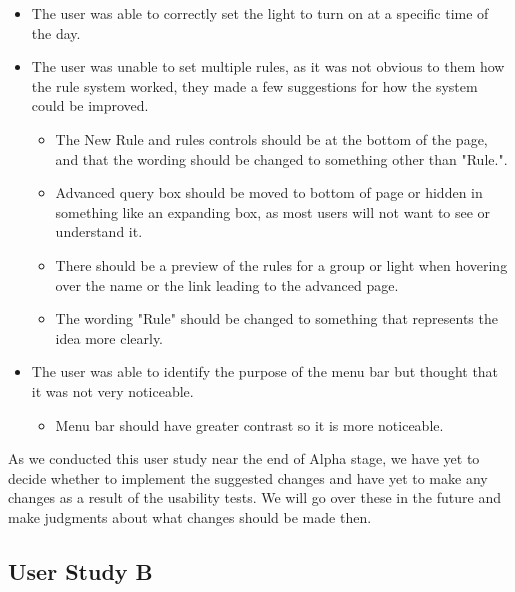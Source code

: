 \documentclass[10pt,draftclsnofoot,onecolumn]{IEEEtran}
\begin{document}
\begin{itemize}
    \item The user was able to correctly set the light to turn on at a specific
        time of the day.
    \item The user was unable to set multiple rules, as it was not obvious to
        them how the rule system worked, they made a few suggestions for how
        the system could be improved.
        \begin{itemize}
            \item The New Rule and rules controls should be at the bottom of
                the page, and that the wording should be changed to something
                other than "Rule.".
            \item Advanced query box should be moved to bottom of page or
                hidden in something like an expanding box, as most users will
                not want to see or understand it.
            \item There should be a preview of the rules for a group or light
                when hovering over the name or the link leading to the advanced
                page.
            \item The wording "Rule" should be changed to something that
                represents the idea more clearly.
        \end{itemize}
    \item The user was able to identify the purpose of the menu bar but thought
        that it was not very noticeable.
        \begin{itemize}
            \item Menu bar should have greater contrast so it is more
                noticeable.
        \end{itemize}
\end{itemize}

As we conducted this user study near the end of Alpha stage, we have yet to
decide whether to implement the suggested changes and have yet to make any
changes as a result of the usability tests. We will go over these in the future
and make judgments about what changes should be made then.

\subsection{User Study B}
\end{document}
